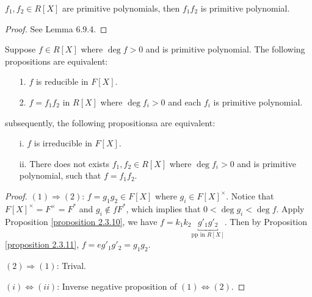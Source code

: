 \begin{lemma}
    $f_1, f_2 \in R[X]$ are primitive polynomials, then $f_1f_2$ is primitive polynomial.
\end{lemma}
\begin{proof}
    See \cite{LWW_AJN} Lemma 6.9.4.
\end{proof}






\begin{proposition}
    \label{proposition 2.3.13}
    Suppose $f \in R[X]$ where $\deg f > 0$ and is primitive polynomial. The following propositions are equivalent:
    \begin{enumerate}
        \item[1.] $f$ is reducible in $F[X]$.
        \item[2.] $f = f_1 f_2$ in $R[X]$ where $\deg f_i > 0$ and each $f_i$ is primitive polynomial.
    \end{enumerate}
    subsequently, the following propositionsa are equivalent:
    \begin{enumerate}
        \item[i.] $f$ is irreducible in $F[X]$.
        \item[ii.] There does not exists $f_1, f_2 \in R[X]$ where $\deg f_i > 0$ and is primitive polynomial, such that $f = f_1 f_2$. 
    \end{enumerate}
\end{proposition}
\begin{proof}
    $(1) \Rightarrow (2)$: $f = g_1 g_2 \in F[X]$ where $g_i \in F[X]^{\times}$. Notice that $F[X]^{\times} = F^{\times} = F^*$ and $g_i \notin f F^*$, which implies that $0< \deg g_i < \deg f$. Apply Proposition \ref{proposition 2.3.10}, we have $f = k_1 k_2 \underbracket{g'_1 g'_2}_{\text{pp in } R[X]}$. Then by Proposition \ref{proposition 2.3.11}, $f = eg'_1 g'_2 = g_1 g_2$.

    $(2) \Rightarrow (1)$: Trival.

    $(i) \Leftrightarrow (ii)$: Inverse negative proposition of $(1) \Leftrightarrow (2)$.
\end{proof}








